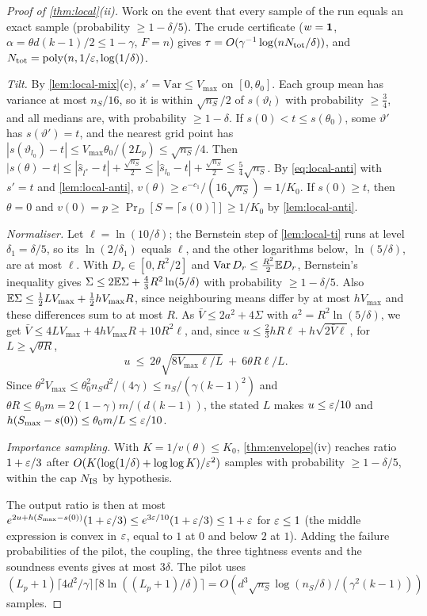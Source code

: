 \begin{proof}[Proof of \cref{thm:local}(ii)]
Work on the event that every sample of the run equals an exact sample (probability
$\ge1-\delta/5$). The crude certificate ($w=\mathbf{1}$, $\alpha=\theta d(k-1)/2\le1-\gamma$, $F=n$) gives
$\tau=O(\gamma^{-1}\log(nN_{\rm tot}/\delta))$, and $N_{\rm tot}=\mathrm{poly}(n,1/\varepsilon,\log(1/\delta))$.

\emph{Tilt.} By \cref{lem:local-mix}(c), $s'=\mathrm{Var}\le V_{\max}$ on $[0,\theta_0]$. Each group mean
has variance at most $n_S/16$, so it is within $\sqrt{n_S}/2$ of $s(\vartheta_l)$ with probability
$\ge\frac34$, and all medians are, with probability $\ge1-\delta$. If $s(0)<t\le s(\theta_0)$, some
$\vartheta'$ has $s(\vartheta')=t$, and the nearest grid point has $|s(\vartheta_{l_0})-t|\le
V_{\max}\theta_0/(2L_p)\le\sqrt{n_S}/4$. Then $|s(\theta)-t|\le|\hat s_{l^*}-t|+\frac{\sqrt{n_S}}2\le|\hat
s_{l_0}-t|+\frac{\sqrt{n_S}}2\le\frac54\sqrt{n_S}$. By \eqref{eq:local-anti} with $s'=t$ and
\cref{lem:local-anti}, $v(\theta)\ge e^{-c_1}/(16\sqrt{n_S})=1/K_0$. If $s(0)\ge t$, then $\theta=0$ and
$v(0)=p\ge\Pr_D[S=\lceil s(0)\rceil]\ge1/K_0$ by \cref{lem:local-anti}.

\emph{Normaliser.} Let $\ell=\ln(10/\delta)$; the Bernstein step of \cref{lem:local-ti} runs at
level $\delta_1=\delta/5$, so its $\ln(2/\delta_1)$ equals $\ell$, and the other logarithms below,
$\ln(5/\delta)$, are at most $\ell$. With $D_r\in[0,R^2/2]$ and
$\mathrm{Var}\,D_r\le\frac{R^2}2\mathbb{E} D_r$, Bernstein's inequality gives
$\Sigma\le2\mathbb{E}\Sigma+\frac43R^2\ln(5/\delta)$ with probability $\ge1-\delta/5$. Also
$\mathbb{E}\Sigma\le\frac12LV_{\max}+\frac12hV_{\max}R$, since neighbouring means differ by at most
$hV_{\max}$ and these differences sum to at most $R$. As $\bar V\le2a^2+4\Sigma$ with
$a^2=R^2\ln(5/\delta)$, we get $\bar V\le4LV_{\max}+4hV_{\max}R+10R^2\ell$, and, since
$u\le\frac23hR\ell+h\sqrt{2\bar V\ell}$, for $L\ge\sqrt{\theta R}$,
\[
u\ \le\ 2\theta\sqrt{8V_{\max}\ell/L}\ +\ 6\theta R\ell/L .
\]
Since $\theta^2V_{\max}\le\theta_0^2n_Sd^2/(4\gamma)\le n_S/(\gamma(k-1)^2)$ and $\theta R\le\theta_0m=2(1-\gamma)m/(d(k-1))$, the
stated $L$ makes $u\le\varepsilon/10$ and $h(S_{\max}-s(0))\le\theta_0m/L\le\varepsilon/10$.

\emph{Importance sampling.} With $K=1/v(\theta)\le K_0$, \cref{thm:envelope}(iv) reaches
ratio $1+\varepsilon/3$ after $O(K(\log(1/\delta)+\log\log K)/\varepsilon^2)$ samples with probability
$\ge1-\delta/5$, within the cap $N_{\rm IS}$ by hypothesis.

The output ratio is then at most $e^{2u+h(S_{\max}-s(0))}(1+\varepsilon/3)\le e^{3\varepsilon/10}(1+\varepsilon/3)\le1+\varepsilon$ for
$\varepsilon\le1$ (the middle expression is convex in $\varepsilon$, equal to $1$ at $0$ and below $2$ at $1$).
Adding the failure probabilities of the pilot, the coupling, the three tightness events and
the soundness events gives at most $3\delta$. The pilot uses
$(L_p+1)\lceil4d^2/\gamma\rceil\lceil8\ln((L_p+1)/\delta)\rceil=O(d^3\sqrt{n_S}\log(n_S/\delta)/(\gamma^2(k-1)))$
samples.
\end{proof}


